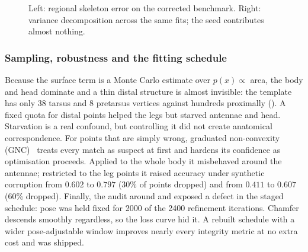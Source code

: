 \begin{figure}[!htb]
\centering
{}
\hfill
{}
\caption[Structure of the skeleton error]{Left: regional skeleton error on the
corrected benchmark. Right: variance decomposition across the same fits; the
seed contributes almost nothing.}
\label{fig:structured-error}
\end{figure}

\subsubsection{Sampling, robustness and the fitting schedule}
\label{sec:sampling}

Because the surface term is a Monte Carlo estimate over $p(x)\propto$ area,
the body and head dominate and a thin distal structure is almost invisible: the
template has only $38$ tarsus and $8$ pretarsus vertices against hundreds
proximally (). A fixed quota for distal points helped the legs but
starved antennae and head. Starvation is a real confound, but controlling it
did not create anatomical correspondence. For points that are simply wrong,
graduated non-convexity (GNC)~\cite{gnc} treats every match as suspect at first
and hardens its confidence as optimisation proceeds. Applied to the whole body
it misbehaved around the antennae; restricted to the leg points it raised
accuracy under synthetic corruption from $0.602$ to $0.797$ (30\% of points
dropped) and from $0.411$ to $0.607$ (60\% dropped). Finally, the audit around
 and  exposed a defect in the staged schedule: pose was held fixed
for 2000 of the 2400 refinement iterations. Chamfer descends smoothly
regardless, so the loss curve hid it. A rebuilt schedule with a wider
pose-adjustable window improves nearly every integrity metric at no extra
cost and was shipped.

